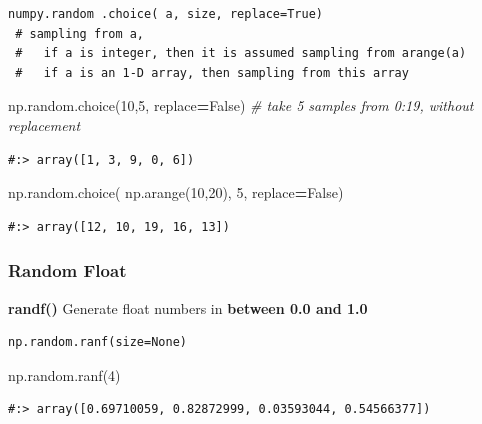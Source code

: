 \documentclass[
]{book}
\newenvironment{Shaded}{\begin{snugshade}}{\end{snugshade}}
\newcommand{\CommentTok}[1]{\textcolor[rgb]{0.37,0.37,0.37}{\textit{#1}}}
\newcommand{\DecValTok}[1]{\textcolor[rgb]{0.06,0.06,0.06}{#1}}
\newcommand{\NormalTok}[1]{#1}
\newcommand{\OperatorTok}[1]{\textcolor[rgb]{0.43,0.43,0.43}{\textbf{#1}}}
\newcommand{\VariableTok}[1]{\textcolor[rgb]{0,0,0}{#1}}
\begin{document}
\begin{verbatim}
numpy.random .choice( a, size, replace=True)
 # sampling from a, 
 #   if a is integer, then it is assumed sampling from arange(a)
 #   if a is an 1-D array, then sampling from this array
\end{verbatim}

\begin{Shaded}
\begin{Highlighting}[]
\NormalTok{np.random.choice(}\DecValTok{10}\NormalTok{,}\DecValTok{5}\NormalTok{, replace}\OperatorTok{=}\VariableTok{False}\NormalTok{) }\CommentTok{# take 5 samples from 0:19, without replacement}
\end{Highlighting}
\end{Shaded}

\begin{verbatim}
#:> array([1, 3, 9, 0, 6])
\end{verbatim}

\begin{Shaded}
\begin{Highlighting}[]
\NormalTok{np.random.choice( np.arange(}\DecValTok{10}\NormalTok{,}\DecValTok{20}\NormalTok{), }\DecValTok{5}\NormalTok{, replace}\OperatorTok{=}\VariableTok{False}\NormalTok{)}
\end{Highlighting}
\end{Shaded}

\begin{verbatim}
#:> array([12, 10, 19, 16, 13])
\end{verbatim}

\hypertarget{random-float}{%
\subsubsection{Random Float}\label{random-float}}

\textbf{randf()} Generate float numbers in \textbf{between 0.0 and 1.0}

\begin{verbatim}
np.random.ranf(size=None)
\end{verbatim}

\begin{Shaded}
\begin{Highlighting}[]
\NormalTok{np.random.ranf(}\DecValTok{4}\NormalTok{)}
\end{Highlighting}
\end{Shaded}

\begin{verbatim}
#:> array([0.69710059, 0.82872999, 0.03593044, 0.54566377])
\end{verbatim}
\end{document}
